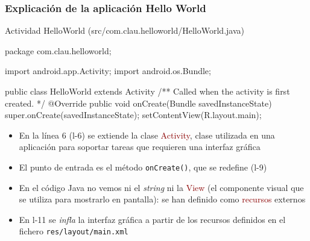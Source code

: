 \documentclass[hyperref={pdfpagelabels=true},utf8x]{beamer}
\newcommand{\res}[1]{\textcolor{darkred}{#1}}
\newcommand{\dif}{\textsl}
\begin{document}
\begin{frame}[fragile, shrink=27]
\frametitle{Explicación de la aplicación Hello World}

\begin{block}{Actividad HelloWorld ({\tiny src/com.clau.helloworld/HelloWorld.java})}
\begin{java}
package com.clau.helloworld;

import android.app.Activity;
import android.os.Bundle;

public class HelloWorld extends Activity {
  /** Called when the activity is first created. */
  @Override
  public void onCreate(Bundle savedInstanceState) {
    super.onCreate(savedInstanceState);
    setContentView(R.layout.main);
  }
}
\end{java}
\end{block}

\begin{itemize}
\item En la línea 6 (l-6) se extiende la clase \res{Activity}, clase
  utilizada en una aplicación para soportar tareas que requieren una
  interfaz gráfica
\item El punto de entrada es el método \verb|onCreate()|, que se
  redefine (l-9)
\item En el código Java no vemos ni el \dif{string} ni la \res{View}
  (el componente visual que se utiliza para mostrarlo en pantalla): se
  han definido como \res{recursos} externos
\item En l-11 se \dif{infla} la interfaz gráfica a partir de los
  recursos definidos en el fichero \verb|res/layout/main.xml|
\end{itemize}

\end{frame}
\end{document}
